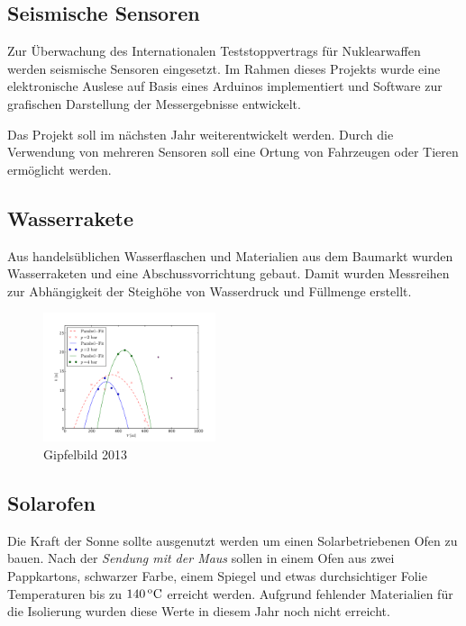 \documentclass[pdftex, twocolumn=true, parskip=half]{scrartcl}
\begin{document}
\subsection{Seismische Sensoren}
Zur Überwachung des Internationalen Teststoppvertrags für Nuklearwaffen werden seismische Sensoren eingesetzt. Im Rahmen dieses Projekts wurde eine elektronische Auslese auf Basis eines Arduinos implementiert und Software zur grafischen Darstellung der Messergebnisse entwickelt.

Das Projekt soll im nächsten Jahr weiterentwickelt werden. Durch die Verwendung von mehreren Sensoren soll eine Ortung von Fahrzeugen oder Tieren ermöglicht werden.
\subsection{Wasserrakete}
Aus handelsüblichen Wasserflaschen und Materialien aus dem Baumarkt wurden Wasserraketen und eine Abschussvorrichtung gebaut. Damit wurden Messreihen zur Abhängigkeit der Steighöhe von Wasserdruck und Füllmenge erstellt.
\begin{figure}[!h]
\centering
\includegraphics[width=0.45\textwidth]{figs/rakete/raketenplot.pdf}
\caption{Gipfelbild 2013}
\end{figure}
\subsection{Solarofen}
Die Kraft der Sonne sollte ausgenutzt werden um einen Solarbetriebenen Ofen zu bauen. Nach der \textit{Sendung mit der Maus} sollen in einem Ofen aus zwei Pappkartons, schwarzer Farbe, einem Spiegel und etwas durchsichtiger Folie Temperaturen bis zu $\unit[140]{^oC}$ erreicht werden. Aufgrund fehlender Materialien für die Isolierung wurden diese Werte in diesem Jahr noch nicht erreicht.
\end{document}
